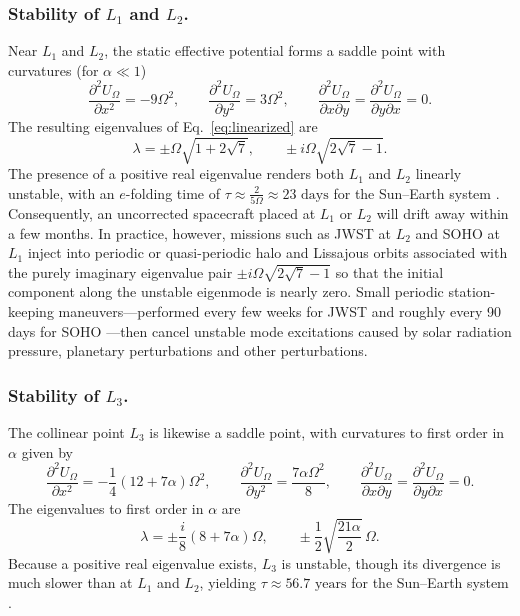 \documentclass[12pt, letterpaper]{article}
\begin{document}
\subsubsection{Stability of \texorpdfstring{$L_1$ and $L_2$}{L1 and L2}.}
Near $L_1$ and $L_2$, the static effective potential forms a saddle point with curvatures (for $\alpha \ll 1$)
$$
\frac{\partial^2 U_\Omega}{\partial x^2} = -9\Omega^2, \qquad
\frac{\partial^2 U_\Omega}{\partial y^2} = 3\Omega^2, \qquad
\frac{\partial^2 U_\Omega}{\partial x \partial y} = \frac{\partial^2 U_\Omega}{\partial y \partial x} = 0.
$$
The resulting eigenvalues of Eq.~\eqref{eq:linearized} are
$$
\lambda = \pm \Omega \sqrt{1 + 2\sqrt{7}}, \qquad \pm i\Omega \sqrt{2\sqrt{7} - 1}.
$$
The presence of a positive real eigenvalue renders both $L_1$ and $L_2$ linearly unstable, with an $e$-folding time of $\tau \approx \frac{2}{5\Omega} \approx 23\text{ days}$ for the Sun--Earth system \cite{cornish}. Consequently, an uncorrected spacecraft placed at $L_1$ or $L_2$ will drift away within a few months. In practice, however, missions such as JWST at $L_2$ \cite{petersen} and SOHO at $L_1$ \cite{roberts} inject into periodic or quasi-periodic halo and Lissajous orbits associated with the purely imaginary eigenvalue pair $\pm i\Omega\sqrt{2\sqrt{7}-1}$ so that the initial component along the unstable eigenmode is nearly zero. Small periodic station-keeping maneuvers---performed every few weeks for JWST \cite{petersen} and roughly every 90 days for SOHO \cite{roberts}---then cancel unstable mode excitations caused by solar radiation pressure, planetary perturbations and other perturbations.

\subsubsection{Stability of \texorpdfstring{$L_3$}{L3}.}
The collinear point $L_3$ is likewise a saddle point, with curvatures to first order in $\alpha$ given by
$$
\frac{\partial^2 U_\Omega}{\partial x^2} = -\frac{1}{4}(12 + 7\alpha)\Omega^2, \qquad
\frac{\partial^2 U_\Omega}{\partial y^2} = \frac{7\alpha \Omega^2}{8}, \qquad
\frac{\partial^2 U_\Omega}{\partial x \partial y} = \frac{\partial^2 U_\Omega}{\partial y \partial x} = 0.
$$
The eigenvalues to first order in $\alpha$ are
$$
\lambda = \pm \frac{i}{8}(8 + 7\alpha)\Omega, \qquad \pm \frac{1}{2}\sqrt{\frac{21\alpha}{2}}\,\Omega.
$$
Because a positive real eigenvalue exists, $L_3$ is unstable, though its divergence is much slower than at $L_1$ and $L_2$, yielding $\tau \approx 56.7\text{ years}$ for the Sun--Earth system \cite{cornish}.
\end{document}
